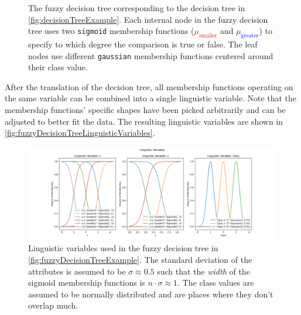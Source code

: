 \begin{figure}[h]

    \caption[Fuzzy decision tree created from the regular decision tree]{The fuzzy decision tree corresponding to the decision tree in \autoref{fig:decisionTreeExample}. Each internal node in the fuzzy decision tree uses two \texttt{sigmoid} membership functions (\textcolor{red}{$\mu_{\text{smaller}}$} and \textcolor{blue}{$\mu_{\text{greater}}$}) to specify to which degree the comparison is true or false. The leaf nodes use different \texttt{gaussian} membership functions centered around their class value.}

    \label{fig:fuzzyDecisionTreeExample}
\end{figure}

After the translation of the decision tree, all membership functions operating on the same variable can be combined into a single linguistic variable. Note that the membership functions' specific shapes have been picked arbitrarily and can be adjusted to better fit the data. The resulting linguistic variables are shown in \autoref{fig:fuzzyDecisionTreeLinguisticVariables}.

\begin{figure}[H]
    \centering

    \includegraphics[width=\linewidth,trim={3.5cm 0 3.5cm 1cm},clip]{figures/ProofOfConcepts/fuzzy_sets.png}

    \caption[Linguistic variables for the converted fuzzy decision tree]{Linguistic variables used in the fuzzy decision tree in \autoref{fig:fuzzyDecisionTreeExample}. The standard deviation of the attributes is assumed to be $\sigma \approx 0.5$ such that the \emph{width} of the sigmoid membership functions is $n\cdot \sigma \approx 1$. The class values are assumed to be normally distributed and are places where they don't overlap much.}
    \label{fig:fuzzyDecisionTreeLinguisticVariables}
\end{figure}

